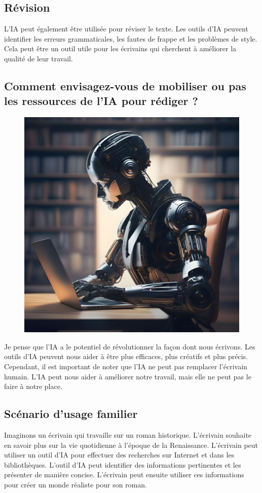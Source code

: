 \documentclass{./StyCls/MyArticle}
\begin{document}
\subsection{Révision}

L'IA peut également être utilisée pour réviser le texte. Les outils d'IA peuvent identifier les erreurs grammaticales, les fautes de frappe et les problèmes de style. Cela peut être un outil utile pour les écrivains qui cherchent à améliorer la qualité de leur travail.

\subsection{Comment envisagez-vous de mobiliser ou pas les ressources de l'IA pour rédiger ?}

\begin{figure}[htb]
    \centering\includegraphics[width=0.5\linewidth]{ai_help.jpg} 
\end{figure}

Je pense que l'IA a le potentiel de révolutionner la façon dont nous écrivons. Les outils d'IA peuvent nous aider à être plus efficaces, plus créatifs et plus précis. Cependant, il est important de noter que l'IA ne peut pas remplacer l'écrivain humain. L'IA peut nous aider à améliorer notre travail, mais elle ne peut pas le faire à notre place.

\subsection{Scénario d'usage familier}

Imaginons un écrivain qui travaille sur un roman historique. L'écrivain souhaite en savoir plus sur la vie quotidienne à l'époque de la Renaissance. L'écrivain peut utiliser un outil d'IA pour effectuer des recherches sur Internet et dans les bibliothèques. L'outil d'IA peut identifier des informations pertinentes et les présenter de manière concise. L'écrivain peut ensuite utiliser ces informations pour créer un monde réaliste pour son roman.
\end{document}
